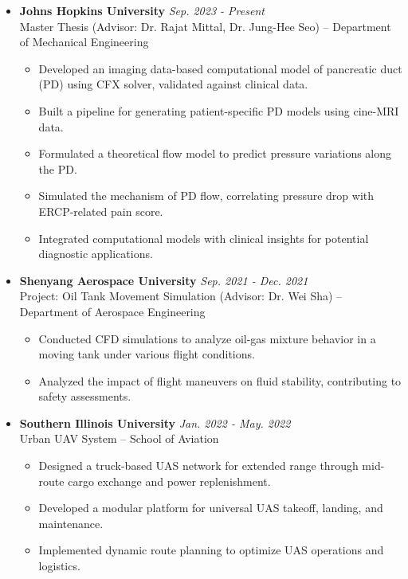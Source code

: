 \documentclass[11pt]{article}
\begin{document}
\begin{itemize}[leftmargin=*,itemsep=1pt]

    \item \textbf{Johns Hopkins University} \hfill \textit{Sep. 2023 - Present} \\
    Master Thesis (Advisor: Dr. Rajat Mittal, Dr. Jung-Hee Seo) – Department of Mechanical Engineering
    \begin{itemize}[leftmargin=*,itemsep=1pt]
        \item Developed an imaging data-based computational model of pancreatic duct (PD) using CFX solver, validated against clinical data.
        \item Built a pipeline for generating patient-specific PD models using cine-MRI data.
        \item Formulated a theoretical flow model to predict pressure variations along the PD.
        \item Simulated the mechanism of PD flow, correlating pressure drop with ERCP-related pain score.
        \item Integrated computational models with clinical insights for potential diagnostic applications.
    \end{itemize}

    \item \textbf{Shenyang Aerospace University} \hfill \textit{Sep. 2021 - Dec. 2021} \\
    Project: Oil Tank Movement Simulation (Advisor: Dr. Wei Sha) – Department of Aerospace Engineering
    \begin{itemize}[leftmargin=*,itemsep=1pt]
        \item Conducted CFD simulations to analyze oil-gas mixture behavior in a moving tank under various flight conditions.
        \item Analyzed the impact of flight maneuvers on fluid stability, contributing to safety assessments.
    \end{itemize}

    \item \textbf{Southern Illinois University} \hfill \textit{Jan. 2022 - May. 2022} \\
    Urban UAV System – School of Aviation
    \begin{itemize}[leftmargin=*,itemsep=1pt]
        \item Designed a truck-based UAS network for extended range through mid-route cargo exchange and power replenishment.
        \item Developed a modular platform for universal UAS takeoff, landing, and maintenance.
        \item Implemented dynamic route planning to optimize UAS operations and logistics.
    \end{itemize}

\end{itemize}
\end{document}

